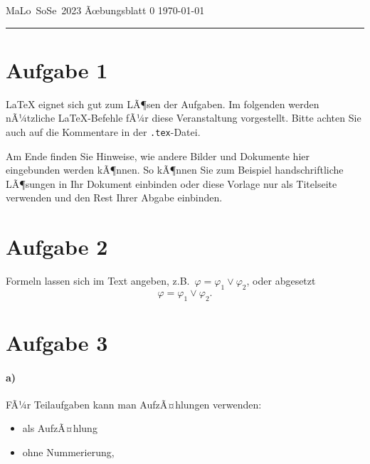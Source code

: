 \documentclass[a4paper, 11pt]{article}
\begin{document}
MaLo~SoSe~2023
\hfill
{\Large
    Ãœbungsblatt 0 %
}
\hfill
\today



\hrule

\section*{Aufgabe 1}

\LaTeX{} eignet sich gut zum LÃ¶sen der Aufgaben.
Im folgenden werden nÃ¼tzliche \LaTeX{}-Befehle fÃ¼r diese Veranstaltung vorgestellt.
Bitte achten Sie auch auf die Kommentare in der \texttt{.tex}-Datei.

Am Ende finden Sie Hinweise, wie andere Bilder und Dokumente hier eingebunden werden kÃ¶nnen.
So kÃ¶nnen Sie zum Beispiel handschriftliche LÃ¶sungen in Ihr Dokument einbinden
oder diese Vorlage nur als Titelseite verwenden und den Rest Ihrer Abgabe einbinden.


\section*{Aufgabe 2}

Formeln lassen sich im Text angeben, z.B.\ $\varphi = \varphi_1 \lor \varphi_2$,
oder abgesetzt
\[
    \varphi = \varphi_1 \lor \varphi_2.
\]


\section*{Aufgabe 3}

\paragraph*{a)}

FÃ¼r Teilaufgaben kann man AufzÃ¤hlungen verwenden:
\begin{itemize}
\item als AufzÃ¤hlung
\item ohne Nummerierung,
\end{itemize}
\end{document}

